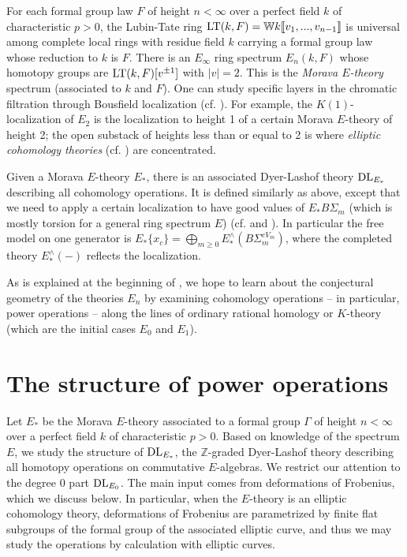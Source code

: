 \documentclass{gtpart}
\theoremstyle{definition}
\theoremstyle{remark}
\newcommand{\mb}[1]{\mathbb{#1}}
\newcommand{\LT}{{\rm LT}}
\newcommand{\DL}{{\rm DL}}
\begin{document}
For each formal group law $F$ of height $n<\infty$ over a perfect field 
$k$ of characteristic $p>0$, the Lubin-Tate ring $\LT(k,F) = 
{\mb W}k \llbracket v_1,...,v_{n-1} \rrbracket$ is universal among 
complete local rings with residue field $k$ carrying a formal group law 
whose reduction to $k$ is $F$.  There is an $E_\infty$ ring spectrum 
$E_n(k,F)$ whose homotopy groups are $\LT(k,F)[v^{\pm1}]$ with $|v| = 2$.  
This is the {\em Morava $E$-theory} spectrum (associated to $k$ and $F$).  
One can study specific layers in the chromatic filtration through 
Bousfield localization (cf. \cite[lectures 20--23]{252x}).  For example, 
the $K(1)$-localization of $E_2$ is the localization to height 1 of a 
certain Morava $E$-theory of height 2; the open substack of heights less 
than or equal to 2 is where {\em elliptic cohomology theories} 
(cf. \cite{survey}) are concentrated.  

Given a Morava $E$-theory $E_*$, there is an associated Dyer-Lashof 
theory $\DL_{E_*}$ describing all cohomology operations.  It is 
defined similarly as above, except that we need to apply a certain 
localization to have good values of $E_* B\Sigma_m$ (which is mostly 
torsion for a general ring spectrum $E$) (cf. \cite[section 3]{strickland} and 
\cite[section 8]{hoveystrickland}).  In particular the free model on one 
generator is $E_*\{x_c\} = 
\bigoplus_{m \geq 0} E_*^\wedge (B\Sigma_m^{cV_m})$, where the completed 
theory $E_*^\wedge (-)$ reflects the localization.  

As is explained at the beginning of \cite{Andu}, we hope to learn about 
the conjectural geometry of the theories $E_n$ by examining cohomology 
operations -- in particular, power operations -- along the lines of 
ordinary rational homology or $K$-theory (which are the initial cases 
$E_0$ and $E_1$).  


\section{The structure of power operations}
\label{sec:at2ec}


Let $E_*$ be the Morava $E$-theory associated to a formal group $\Gamma$ 
of height $n<\infty$ over a perfect field $k$ of characteristic $p>0$.  
Based on knowledge of the spectrum $E$, we study the structure of 
$\DL_{E_*}$, the $\mb Z$-graded Dyer-Lashof theory describing all homotopy operations on commutative $E$-algebras.  We 
restrict our attention to the degree 0 part $\DL_{E_0}$.  The main input 
comes from deformations of Frobenius, which we discuss below.  In 
particular, when the $E$-theory is an elliptic cohomology theory, deformations of Frobenius are parametrized by 
finite flat subgroups of the formal group of the associated elliptic curve, 
and thus we may study the operations by calculation with elliptic curves.  
\end{document}
